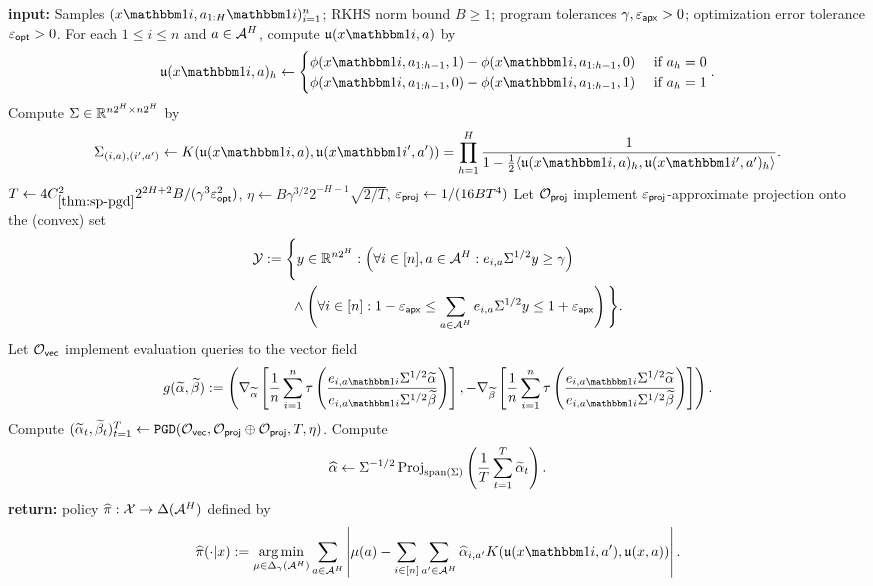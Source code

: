 \begin{algorithm}[tp]
\caption{$\KernRho((x\ind{i},a\ind{i}_{1:H})_{i=1}^n, B,\gamma,\epapx,\epopt)$}\label{alg:kernrho}
\begin{algorithmic}[1]
\State \textbf{input:} Samples $(x\ind{i},a_{1:H}\ind{i})_{i=1}^n$; RKHS norm bound $B\geq 1$; program tolerances $\gamma,\varepsilon_{\mathsf{apx}}>0$; optimization error tolerance $\varepsilon_{\mathsf{opt}}>0$.
\State For each $1 \leq i \leq n$ and $a \in \mathcal{A}^H$, compute $\uop{x\ind{i}}{a}$ by
\[\uop{x\ind{i}}{a}_h \gets 
\begin{cases} 
\phi(x\ind{i},a_{1:h-1}, 1) - \phi(x\ind{i},a_{1:h-1}, 0) & \text{ if } a_h = 0 \\ 
\phi(x\ind{i},a_{1:h-1}, 0) - \phi(x\ind{i},a_{1:h-1}, 1) & \text{ if } a_h = 1
\end{cases}.
\]
\State Compute $\Sigma \in \mathbb{R}^{n2^H \times n2^H}$ by
\begin{equation} 
\Sigma_{(i,a),(i',a')} \gets K(\uop{x\ind{i}}{a}, \uop{x\ind{i'}}{a'}) = \prod_{h=1}^H \frac{1}{1 - \frac{1}{2}\langle \uop{x\ind{i}}{a}_h, \uop{x\ind{i'}}{a'}_h\rangle}.
\label{eq:sigma-def}
\end{equation}
\State $T \gets 4C_{\ref{thm:sp-pgd}}^2 2^{2H+2} B/(\gamma^3 \varepsilon_{\mathsf{opt}}^2)$, $\eta \gets B\gamma^{3/2}2^{-H-1}\sqrt{2/T}$, $\varepsilon_{\mathsf{proj}} \gets 1/(16BT^4)$
\State Let $\mathcal{O}_{\mathsf{proj}}$ implement $\varepsilon_{\mathsf{proj}}$-approximate projection onto the (convex) set
\begin{align} 
\mathcal{Y} &:= \Bigg\{y \in \mathbb{R}^{n2^H}:  \left(\forall i\in[n],a\in\mathcal{A}^H: e_{i,a} \Sigma^{1/2} y \geq \gamma\right) \\ 
&\qquad\land \left(\forall i \in [n]: 1-\varepsilon_{\mathsf{apx}} \leq \sum_{a\in\mathcal{A}^H} e_{i,a} \Sigma^{1/2} y \leq 1+\varepsilon_{\mathsf{apx}}\right)\Bigg\}.
\label{eq:y-def}
\end{align}
\State Let $\mathcal{O}_{\mathsf{vec}}$ implement evaluation queries to the vector field
\[g(\alphatil,\betatil) := \left(\grad_{\alphatil}\left[\frac{1}{n}\sum_{i=1}^n \tau\left(\frac{e_{i,a\ind{i}}\Sigma^{1/2}\alphatil}{e_{i,a\ind{i}}\Sigma^{1/2}\betatil}\right)\right],-\grad_{\betatil}\left[\frac{1}{n}\sum_{i=1}^n \tau\left(\frac{e_{i,a\ind{i}}\Sigma^{1/2}\alphatil}{e_{i,a\ind{i}}\Sigma^{1/2}\betatil}\right)\right]\right).\]
\State Compute $(\widetilde\alpha_t,\widetilde\beta_t)_{t=1}^T \gets \texttt{PGD}(\mathcal{O}_{\mathsf{vec}},\mathcal{O}_{\mathsf{proj}}\oplus\mathcal{O}_{\mathsf{proj}},T,\eta)$.\label{line:pgd-apply}
\State Compute 
\begin{equation} \widehat{\alpha} \gets \Sigma^{-1/2} \operatorname{Proj}_{\operatorname{span}(\Sigma)} \left(\frac{1}{T}\sum_{t=1}^T \widetilde\alpha_t\right).\label{line:wh-alpha}\end{equation}
\State \textbf{return:} policy $\widehat{\pi}:\mathcal{X} \to \Delta(\mathcal{A}^H)$ defined by
\[\pihat(\cdot|x) := \argmin_{\mu \in \Delta_\gamma(\MA^H)} \sum_{a \in \MA^H} \left| \mu(a) - \sum_{i \in [n]}\sum_{a' \in \MA^H} \wh\alpha_{i,a'} K(\uop{x\ind{i}}{a'}, \uop{x}{a})\right|.\]
\end{algorithmic}
\end{algorithm}
